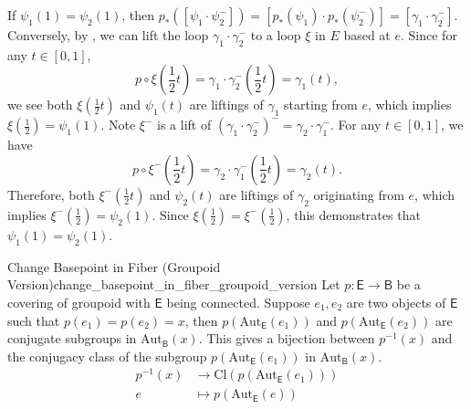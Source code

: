 \documentclass{report}
\begin{document}
\begin{prf}
	If $\psi_1(1)=\psi_2(1)$, then $p_*\left(\left[\psi_1 \cdot \psi_2^{-}\right]\right)=\left[p_*(\psi_1) \cdot p_*(\psi_2^{-})\right]=\left[\gamma_1 \cdot \gamma_2^{-}\right]$. Conversely, by , we can lift the loop $\gamma_1 \cdot \gamma_2^{-}$ to a loop $\xi$ in $E$ based at $e$. Since for any $t\in [0,1]$,
	\[
		p\circ\xi\left(\frac{1}{2}t\right)=\gamma_1 \cdot \gamma_2^{-}\left(\frac{1}{2}t\right)=\gamma_1(t),
	\]
	we see both $\xi\left(\frac{1}{2}t\right)$ and $\psi_1(t)$ are liftings of $\gamma_1$ starting from $e$, which implies $\xi(\frac{1}{2})=\psi_1(1)$. Note $\xi^{-}$ is a lift of $\left(\gamma_1 \cdot \gamma_2^{-}\right)^{-}=\gamma_2 \cdot \gamma_1^{-}$. For any $t\in [0,1]$, we have
	\[
		p\circ \xi^{-}\left(\frac{1}{2}t\right)=\gamma_2 \cdot \gamma_1^{-}\left(\frac{1}{2}t\right)=\gamma_2(t).
	\]
	Therefore, both $\xi^{-}\left(\frac{1}{2}t\right)$ and $\psi_2(t)$ are liftings of $\gamma_2$ originating from $e$, which implies $\xi^{-}\left(\frac{1}{2}\right)=\psi_2(1)$. Since $\xi\left(\frac{1}{2}\right)=\xi^{-}\left(\frac{1}{2}\right)$, this demonstrates that $\psi_1(1)=\psi_2(1)$.
\end{prf}

\begin{proposition}{Change Basepoint in Fiber (Groupoid Version)}{change_basepoint_in_fiber_groupoid_version}
	Let $p:\mathsf{E}\to\mathsf{B}$ be a covering of groupoid with $\mathsf{E}$ being connected. Suppose $e_1,e_2$ are two objects of $\mathsf{E}$ such that $p(e_1)=p(e_2)=x$, then $p(\mathrm{Aut}_\mathsf{E}(e_1))$ and $p(\mathrm{Aut}_\mathsf{E}(e_2))$ are conjugate subgroups in $\mathrm{Aut}_{\mathsf{B}}(x)$. This gives a bijection between $p^{-1}(x)$ and the conjugacy class of the subgroup $p(\mathrm{Aut}_\mathsf{E}(e_1))$ in $\mathrm{Aut}_{\mathsf{B}}(x)$.
	\begin{align*}
		p^{-1}(x) & \longrightarrow \mathrm{Cl}(p(\mathrm{Aut}_\mathsf{E}(e_1))) \\
		e         & \longmapsto p(\mathrm{Aut}_\mathsf{E}(e))
	\end{align*}
\end{proposition}
\end{document}
